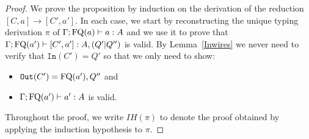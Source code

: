 \documentclass[twoside]{article}
\begin{document}
\begin{proof}
We prove the proposition by induction on the derivation of the reduction 
 $[C,a]\to[C',a']$. In each case, we start by reconstructing 
the unique typing derivation $\pi$ of $\Gamma;\mathop{\textrm{FQ}}\nolimits(a)\vdash a:A$ and we use 
it to prove that $\Gamma;\mathop{\textrm{FQ}}\nolimits(a')\vdash [C',a']:A,(Q'|Q'')$ is valid. 
By Lemma~\hyperref[Inwires]{\ref*{Inwires}} we never need to 
verify that $\mathtt{In}(C')=Q'$ so that we only need to show:
\begin{itemize}
  \item $\mathtt{Out}(C')=\mathop{\textrm{FQ}}\nolimits(a'),Q''$ and
  \item $\Gamma;\mathop{\textrm{FQ}}\nolimits(a')\vdash a':A$ is valid.
\end{itemize}
Throughout the proof, we write $IH(\pi)$ to denote the proof obtained by applying 
the induction hypothesis to $\pi$.


\end{proof}
\end{document}
